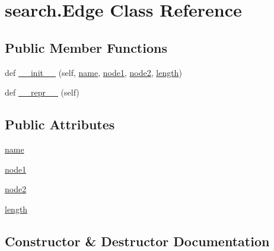 \hypertarget{classsearch_1_1_edge}{}\section{search.\+Edge Class Reference}
\label{classsearch_1_1_edge}
\subsection*{Public Member Functions}
\begin{DoxyCompactItemize}
\item 
def \hyperlink{classsearch_1_1_edge_a58e9a039a804fb8c4fd4c194a08d43ba}{\+\_\+\+\_\+init\+\_\+\+\_\+} (self, \hyperlink{classsearch_1_1_edge_a8c7e9c6b1ae728744825b17b07945d1a}{name}, \hyperlink{classsearch_1_1_edge_a2d67303a400e0a0437658128ea8834f0}{node1}, \hyperlink{classsearch_1_1_edge_a7eb563624f0f999e7dacbdaea118fe40}{node2}, \hyperlink{classsearch_1_1_edge_a965a3118a05ae3ff7bc536b4eec87ba2}{length})
\item 
def \hyperlink{classsearch_1_1_edge_a8b651a17bb87d768fe34178c8540a4d3}{\+\_\+\+\_\+repr\+\_\+\+\_\+} (self)
\end{DoxyCompactItemize}
\subsection*{Public Attributes}
\begin{DoxyCompactItemize}
\item 
\hyperlink{classsearch_1_1_edge_a8c7e9c6b1ae728744825b17b07945d1a}{name}
\item 
\hyperlink{classsearch_1_1_edge_a2d67303a400e0a0437658128ea8834f0}{node1}
\item 
\hyperlink{classsearch_1_1_edge_a7eb563624f0f999e7dacbdaea118fe40}{node2}
\item 
\hyperlink{classsearch_1_1_edge_a965a3118a05ae3ff7bc536b4eec87ba2}{length}
\end{DoxyCompactItemize}


\subsection{Constructor \& Destructor Documentation}
\hypertarget{classsearch_1_1_edge_a58e9a039a804fb8c4fd4c194a08d43ba}{}
